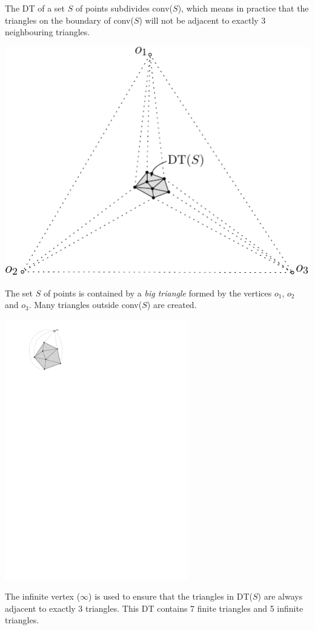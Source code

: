 The DT of a set $S$ of points subdivides conv($S$), which means in practice that the triangles on the boundary of conv($S$) will not be adjacent to exactly 3 neighbouring triangles.

\begin{marginfigure}
  \centering
  \includegraphics[width=\textwidth]{big_tr}
  \caption[The big triangle containing all the dataset.]{The set $S$ of points is contained by a \emph{big triangle} formed by the vertices $o_1$, $o_2$ and $o_3$. Many triangles outside conv($S$) are created.}%
\label{fig:big_tr}
\end{marginfigure}
\begin{marginfigure}
  \centering
  \includegraphics[width=0.6\textwidth]{infinite_vertex}
  \caption[The infinite vertex.]{The infinite vertex ($\infty$) is used to ensure that the triangles in DT($S$) are always adjacent to exactly 3 triangles. This DT contains 7 finite triangles and 5 infinite triangles.}%
\label{fig:infinite_vertex}
\end{marginfigure}
